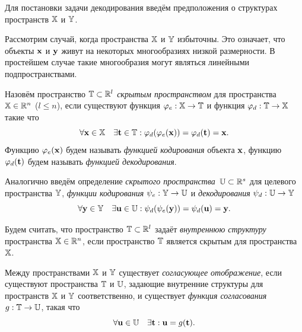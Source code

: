 Для постановки задачи декодирования введём предположения о структурах пространств $\mathbb{X}$ и $\mathbb{Y}$.
\begin{assumption}
	Рассмотрим случай, когда пространства $\mathbb{X}$ и $\mathbb{Y}$ избыточны. Это означает, что объекты $\mathbf{x}$ и $\mathbf{y}$ живут на некоторых многообразиях низкой размерности. В простейшем случае такие многообразия могут являться линейными подпространствами.
\end{assumption}

\begin{definition}
	Назовём пространство $\mathbb{T} \subset \mathbb{R}^l$ \textit{скрытым пространством} для пространства $\mathbb{X} \in \mathbb{R}^n$ ($l \leq n$), если существуют функция $\varphi_e: \mathbb{X} \to \mathbb{T}$ и функция $\varphi_d: \mathbb{T}  \to \mathbb{X}$ такие что
	\[
		\forall \mathbf{x} \in \mathbb{X} \quad \exists \mathbf{t} \in \mathbb{T}: \varphi_d (\varphi_e(\mathbf{x})) = \varphi_d(\mathbf{t}) = \mathbf{x}.
	\]
	Функцию $\varphi_e(\mathbf{x})$ будем называть \textit{функцией кодирования} объекта $\mathbf{x}$, функцию $\varphi_d(\mathbf{t})$ будем называть \textit{функцией декодирования}. 
	
	
	Аналогично введём определение \textit{скрытого пространства}~$\mathbb{U} \subset \mathbb{R}^s$ для целевого пространства $\mathbb{Y}$, \textit{функции кодирования} $\psi_e: \mathbb{Y} \to \mathbb{U}$ и \textit{декодирования} $\psi_d: \mathbb{U}  \to \mathbb{Y}$
	\[
	\forall \mathbf{y} \in \mathbb{Y} \quad  \exists \mathbf{u} \in \mathbb{U}: \psi_d (\psi_e(\mathbf{y})) = \psi_d(\mathbf{u}) = \mathbf{y}.
	\]
\end{definition}

\begin{definition}
	Будем считать, что пространство $\mathbb{T} \subset \mathbb{R}^l$ задаёт \textit{внутреннюю структуру} пространства $\mathbb{X} \in \mathbb{R}^n$, если пространство $\mathbb{T}$ является скрытым для пространства $\mathbb{X}$.
\end{definition}

\begin{definition}
	Между пространствами $\mathbb{X}$ и $\mathbb{Y}$ существует \textit{согласующее отображение}, если существуют пространства $\mathbb{T}$ и $\mathbb{U}$, задающие внутренние структуры для пространств $\mathbb{X}$ и $\mathbb{Y}$ соответственно, и существует \textit{функция согласования} $g: \mathbb{T} \rightarrow \mathbb{U}$, такая что
	\[
	 \forall \mathbf{u} \in \mathbb{U} \quad \exists \mathbf{t}:  \mathbf{u} = g(\mathbf{t}).
	\]
\end{definition}

